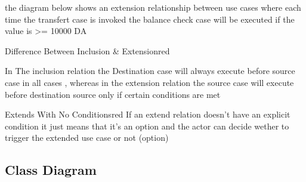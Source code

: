 \vspace{0.25cm}
the diagram below shows an extension relationship between use cases where each time the transfert case is invoked
the balance check case will be executed if the value is \textgreater= 10000 DA

\vspace{0.15cm}


        \begin{center}
    \end{center}

        \vspace{1cm}

\begin{prettyBox}{Difference Between Inclusion \& Extension}{red}

In The inclusion relation the Destination case will always execute before source case in all cases , whereas
in the extension relation the source case will execute before destination source only if certain conditions
are met

\end{prettyBox}


\vspace{0.5cm}

\begin{prettyBox}{Extends With No Conditions}{red}
If an extend relation doesn't have an explicit condition it just means that it's an option and
the actor can decide wether to trigger the extended use case or not (option)
\end{prettyBox}

\subsection{Class Diagram}

